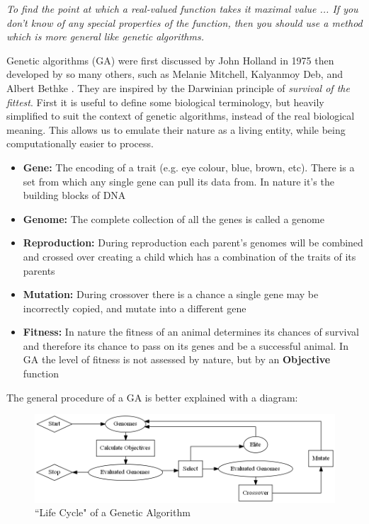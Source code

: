 \documentclass[11pt]{article}
\begin{document}
    \begin{displayquote} \textit {
        To find the point at which a real-valued function takes it maximal value ...
        If you don't know of any special properties of the function, then you
        should use a method which is more general like genetic algorithms.
    } \end{displayquote}

    Genetic algorithms (GA) were first 
    discussed by John Holland \cite{Holland} in 1975 then developed by so many
    others, such as Melanie Mitchell, Kalyanmoy Deb, and Albert Bethke
    \cite{Mitchell, KalyanmoyDeb, Bethke, Goldberg, Grefenstette}.
    They are inspired by the Darwinian
    principle of \textit{survival of the fittest}.
    First it is useful to define some biological terminology, but heavily simplified to suit the
    context of genetic algorithms, instead of the real biological meaning. This allows us to
    emulate their nature as a living entity, while being computationally easier to process.

    \begin{itemize}
        \item{\textbf{Gene:} The encoding of a trait (e.g. eye colour, blue, brown, etc). There is a set
            from which any single gene can pull its data from. In nature it's the building blocks
            of DNA}
        \item{\textbf{Genome:} The complete collection of all the genes is called a
            genome}
        \item{\textbf{Reproduction:} During reproduction each parent's genomes will be
            combined and crossed over creating a child which has a combination of
            the traits of its parents}
        \item{\textbf{Mutation:} During crossover there is a chance a single gene
            may be incorrectly copied, and mutate into a different gene}
        \item{\textbf{Fitness: } In nature the fitness of an animal determines
            its chances of survival and therefore its chance to pass on its genes
            and be a successful animal. In GA the level of fitness is not assessed
            by nature, but by an \textbf{Objective} function}
    \end{itemize}

    The general procedure of a GA is better explained with a diagram:

    \begin{figure}[H] %
        \centering
        \includegraphics[width=\textwidth]{GA}
        \caption{``Life Cycle" of a Genetic Algorithm}\label{fig:GA}
    \end{figure}
\end{document}
